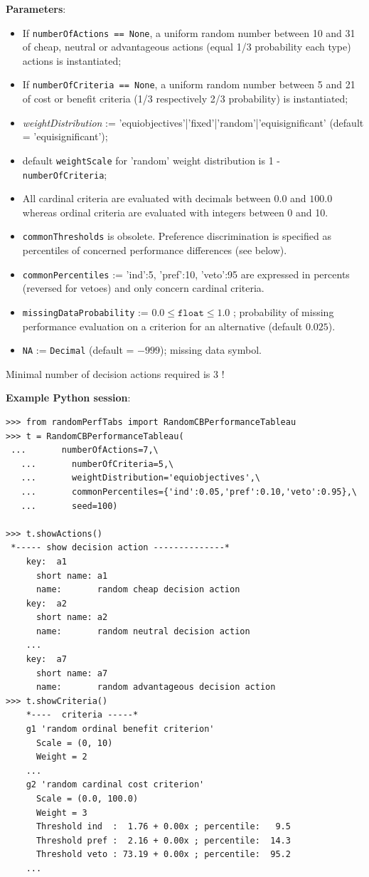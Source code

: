 \textbf{Parameters}:
\begin{itemize}
\item If \texttt{numberOfActions == None}, a uniform random number between 10 and 31 of cheap, neutral or advantageous actions (equal 1/3 probability each type) actions is instantiated;
\item If \texttt{numberOfCriteria == None}, a uniform random number between 5 and 21 of cost or benefit criteria (1/3 respectively 2/3 probability) is instantiated;
\item \emph{weightDistribution} := {'equiobjectives'|'fixed'|'random'|'equisignificant' (default = 'equisignificant')};
\item default \texttt{weightScale} for 'random' weight distribution is 1 - \texttt{numberOfCriteria};
\item All cardinal criteria are evaluated with decimals between $0.0$ and $100.0$ whereas ordinal criteria are evaluated with integers between 0 and 10.
\item \texttt{commonThresholds} is obsolete. Preference discrimination is specified as percentiles of concerned performance differences (see below).
\item \texttt{commonPercentiles} := {'ind':5, 'pref':10, 'veto':95} are expressed in percents (reversed for vetoes) and only concern cardinal criteria.
\item \texttt{missingDataProbability} := $0.0 \leq \mathtt{float} \leq 1.0$ ; probability of missing performance evaluation on a criterion for an alternative (default $0.025$).
\item \texttt{NA} := \texttt{Decimal} (default = $-999$); missing data symbol. 
\end{itemize}

Minimal number of decision actions required is 3 ! 

\noindent \textbf{Example Python session}:

\begin{lstlisting}[caption={Generating a random Cost-Benefit performance tableau},label=list:6.2]
>>> from randomPerfTabs import RandomCBPerformanceTableau
>>> t = RandomCBPerformanceTableau(
 ...       numberOfActions=7,\
   ...       numberOfCriteria=5,\
   ...       weightDistribution='equiobjectives',\
   ...       commonPercentiles={'ind':0.05,'pref':0.10,'veto':0.95},\
   ...       seed=100)

>>> t.showActions()
 *----- show decision action --------------*
    key:  a1
      short name: a1
      name:       random cheap decision action
    key:  a2
      short name: a2
      name:       random neutral decision action
    ...
    key:  a7
      short name: a7
      name:       random advantageous decision action
>>> t.showCriteria()
    *----  criteria -----*
    g1 'random ordinal benefit criterion'
      Scale = (0, 10)
      Weight = 2
    ...
    g2 'random cardinal cost criterion'
      Scale = (0.0, 100.0)
      Weight = 3 
      Threshold ind  :  1.76 + 0.00x ; percentile:   9.5
      Threshold pref :  2.16 + 0.00x ; percentile:  14.3
      Threshold veto : 73.19 + 0.00x ; percentile:  95.2
    ...
 \end{lstlisting}

